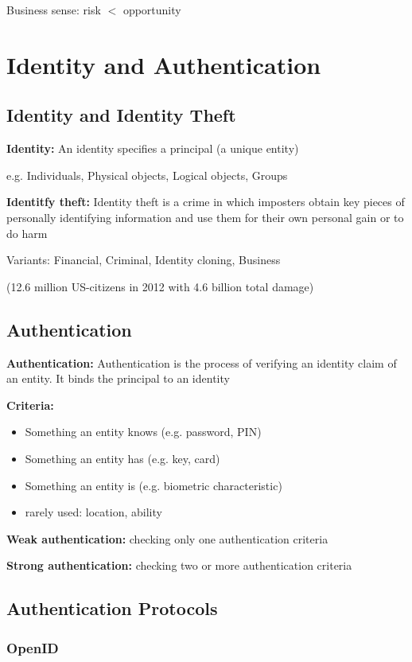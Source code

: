 \documentclass[fs, footer]{latex4ei}
\begin{document}
\begin{multicols*}{4}
{Business sense: risk $<$ opportunity
}


\section{Identity and Authentication}

\subsection{Identity and Identity Theft}

\textbf{Identity:} An identity specifies a principal (a unique entity)

e.g. Individuals, Physical objects, Logical objects, Groups

\textbf{Identitfy theft:} Identity theft is a crime in which imposters obtain key pieces of personally identifying information and use them for their own personal gain or to do harm

Variants: Financial, Criminal, Identity cloning, Business

(12.6 million US-citizens in 2012 with 4.6 billion total damage)

\subsection{Authentication}

\textbf{Authentication:} Authentication is the process of verifying an identity claim of an entity. It binds the principal to an identity

\textbf{Criteria:}
\begin{itemize}
	\item Something an entity knows (e.g. password, PIN)
	\item Something an entity has (e.g. key, card)
	\item Something an entity is (e.g. biometric characteristic)
	\item rarely used: location, ability
\end{itemize}

\textbf{Weak authentication:} checking only one authentication criteria

\textbf{Strong authentication:} checking two or more authentication criteria

\subsection{Authentication Protocols}
\subsubsection{OpenID}


\end{multicols*}
\end{document}
